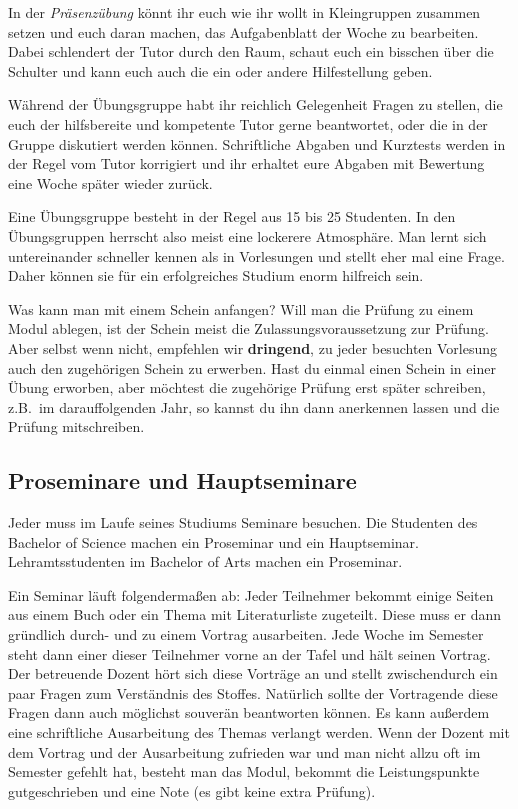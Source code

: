 In der {\it Präsenzübung} könnt ihr euch wie ihr wollt
in Kleingruppen zusammen setzen und euch daran machen,
das Aufgabenblatt der Woche zu bearbeiten.
Dabei schlendert der Tutor durch den Raum,
schaut euch ein bisschen über die Schulter
und kann euch auch die ein oder andere Hilfestellung geben.

Während der Übungsgruppe habt ihr reichlich Gelegenheit
Fragen zu stellen, die euch der hilfsbereite
und kompetente Tutor gerne beantwortet,
oder die in der Gruppe diskutiert werden können.
Schriftliche Abgaben und Kurztests werden in der Regel
vom Tutor korrigiert und ihr erhaltet eure Abgaben
mit Bewertung eine Woche später wieder zurück.

Eine Übungsgruppe besteht in der Regel aus 15 bis 25 Studenten.
In den Übungsgruppen herrscht also meist eine lockerere Atmosphäre.
Man lernt sich untereinander schneller kennen
als in Vorlesungen und stellt eher mal eine Frage.
Daher können sie für ein erfolgreiches Studium enorm hilfreich sein.

Was kann man mit einem Schein anfangen?
Will man die Prüfung zu einem Modul ablegen,
ist der Schein meist die Zulassungsvoraussetzung zur Prüfung.
Aber selbst wenn nicht, empfehlen wir {\bf dringend},
zu jeder besuchten Vorlesung auch den zugehörigen Schein zu erwerben.
Hast du einmal einen Schein in einer Übung erworben,
aber möchtest die zugehörige Prüfung erst später schreiben,
z.B.\ im darauffolgenden Jahr, so kannst du ihn dann anerkennen lassen
und die Prüfung mitschreiben.

\subsection{Proseminare und Hauptseminare}
\label{Proseminar}
Jeder muss im Laufe seines Studiums Seminare besuchen.
Die Studenten des Bachelor of Science
machen ein Proseminar und ein Hauptseminar. 
Lehramtsstudenten im Bachelor of Arts
machen ein Proseminar.

Ein Seminar läuft folgendermaßen ab:
Jeder Teilnehmer bekommt einige Seiten
aus einem Buch oder ein Thema mit Literaturliste zugeteilt.
Diese muss er dann gründlich durch- und zu einem Vortrag ausarbeiten.
Jede Woche im Semester steht dann einer dieser Teilnehmer
vorne an der Tafel und hält seinen Vortrag.
Der betreuende Dozent hört sich diese Vorträge
an und stellt zwischendurch ein paar Fragen
zum Verständnis des Stoffes.
Natürlich sollte der Vortragende diese Fragen
dann auch möglichst souverän beantworten können.
Es kann außerdem eine schriftliche Ausarbeitung
des Themas verlangt werden. 
Wenn der Dozent mit dem Vortrag
und der Ausarbeitung zufrieden war und man nicht
allzu oft im Semester gefehlt hat,
besteht man das Modul, bekommt die Leistungspunkte gutgeschrieben
und eine Note (es gibt keine extra Prüfung).

